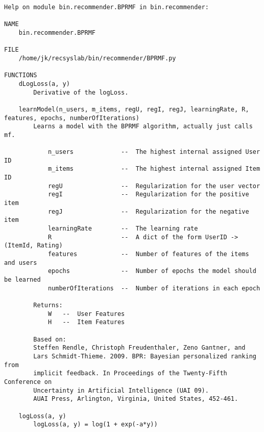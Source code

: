 \begin{lstlisting}[style=docstring]
Help on module bin.recommender.BPRMF in bin.recommender:

NAME
    bin.recommender.BPRMF

FILE
    /home/jk/recsyslab/bin/recommender/BPRMF.py

FUNCTIONS
    dLogLoss(a, y)
        Derivative of the logLoss.
    
    learnModel(n_users, m_items, regU, regI, regJ, learningRate, R, features, epochs, numberOfIterations)
        Learns a model with the BPRMF algorithm, actually just calls mf.
        
            n_users             --  The highest internal assigned User ID
            m_items             --  The highest internal assigned Item ID
            regU                --  Regularization for the user vector
            regI                --  Regularization for the positive item
            regJ                --  Regularization for the negative item
            learningRate        --  The learning rate
            R                   --  A dict of the form UserID -> (ItemId, Rating)
            features            --  Number of features of the items and users
            epochs              --  Number of epochs the model should be learned
            numberOfIterations  --  Number of iterations in each epoch
        
        Returns:
            W   --  User Features
            H   --  Item Features
        
        Based on:
        Steffen Rendle, Christoph Freudenthaler, Zeno Gantner, and
        Lars Schmidt-Thieme. 2009. BPR: Bayesian personalized ranking from
        implicit feedback. In Proceedings of the Twenty-Fifth Conference on
        Uncertainty in Artificial Intelligence (UAI 09).
        AUAI Press, Arlington, Virginia, United States, 452-461.
    
    logLoss(a, y)
        logLoss(a, y) = log(1 + exp(-a*y))
\end{lstlisting}

